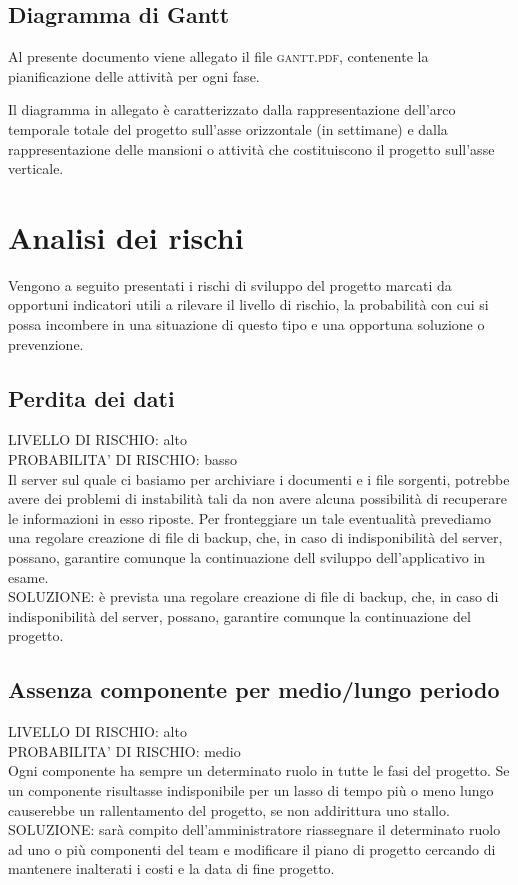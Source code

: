 \documentclass[11pt,a4paper]{article}
\begin{document}
\subsection{Diagramma di Gantt}
Al presente documento viene allegato il file \textsc{gantt.pdf}, contenente la pianificazione delle attività per ogni fase.

Il diagramma in allegato è caratterizzato dalla rappresentazione dell'arco temporale totale del progetto sull'asse orizzontale (in settimane) e dalla rappresentazione delle mansioni o attività che costituiscono il progetto sull'asse verticale.

\section{Analisi dei rischi}
Vengono a seguito presentati i rischi di sviluppo del progetto marcati da opportuni indicatori utili a rilevare il livello di rischio, la probabilità con cui si possa incombere in una situazione di questo tipo e una opportuna soluzione o prevenzione.
\subsection{Perdita dei dati}
LIVELLO DI RISCHIO: alto \\
PROBABILITA' DI RISCHIO: basso \\
Il server sul quale ci basiamo per archiviare i documenti e i file sorgenti, potrebbe avere dei problemi di instabilità tali da non avere alcuna possibilità di recuperare le informazioni in esso riposte.
Per fronteggiare un tale eventualità prevediamo una regolare creazione di file di backup, che, in caso di indisponibilità del server, possano, garantire comunque la continuazione dell sviluppo dell'applicativo in esame. \\
SOLUZIONE: è prevista una regolare creazione di file di backup, che, in caso di indisponibilità del server, possano, garantire comunque la continuazione del progetto.
\subsection{Assenza componente per medio/lungo periodo}
LIVELLO DI RISCHIO: alto \\
PROBABILITA' DI RISCHIO: medio \\
Ogni componente ha sempre un determinato ruolo in tutte le fasi del progetto.
Se un componente risultasse indisponibile per un lasso di tempo più o meno lungo causerebbe un rallentamento del progetto, se non addirittura uno stallo. \\
SOLUZIONE: sarà compito dell'amministratore riassegnare il determinato ruolo ad uno o più componenti del team e modificare il piano di progetto cercando di mantenere inalterati i costi e la data di fine progetto.
\end{document}
